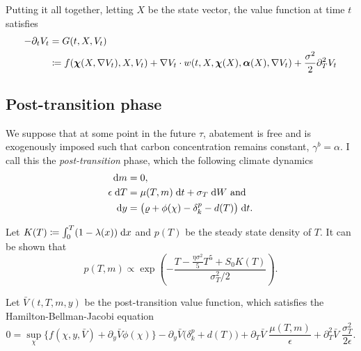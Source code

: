\documentclass[../../main.tex]{subfiles}
\begin{document}
Putting it all together, letting $X$ be the state vector, the value function at time $t$ satisfies \begin{equation}
    \begin{split}
        -\partial_t V_t &= G(t, X, V_t) \\
        &\coloneqq f(\bm{\chi}(X, \nabla V_t), X, V_t) + \nabla V_t \cdot w(t, X, \bm{\chi}(X), \bm{\alpha}(X),  \nabla V_t) + \frac{\sigma^2}{2} \partial_{T}^2 V_t
    \end{split}
\end{equation}


\subsection{Post-transition phase}

We suppose that at some point in the future $\tau$, abatement is free and is exogenously imposed such that carbon concentration remains constant, $\gamma^b = \alpha$. I call this the \textit{post-transition} phase, which the following climate dynamics \begin{align}
    \mathrm{d}m &= 0, \\
    \epsilon \; \mathrm{d}T &= \mu(T, m) \; \mathrm{d}t + \sigma_T \; \mathrm{d}W \text{ and } \\
    \mathrm{d}y &= \big( \varrho + \phi(\chi) - \delta_k^p - d(T) \big) \; \mathrm{d}t.
\end{align}

Let $K(T) \coloneqq \int^T_0 (1 - \lambda(x)) \; \mathrm{d}x$ and $p(T)$ be the steady state density of $T$. It can be shown that \begin{equation}
    p(T, m) \propto \exp\left(-\frac{T - \frac{\eta \sigma^2}{5} T^5 + S_0 K(T)}{\sigma_T^2 / 2}\right).
\end{equation}

\newpage

Let $\bar{V}(t, T, m, y)$ be the post-transition value function, which satisfies the Hamilton-Bellman-Jacobi equation \begin{equation}
    0 = \sup_{\chi} \Big\{f(\chi, y, \bar{V}) +  \partial_y \bar{V} \phi(\chi) \Big\} - \partial_y \bar{V} \Big(\delta^{p}_k + d(T)\Big) + \partial_T \bar{V} \; \frac{\mu(T, m)}{\epsilon}+ \partial^2_T \bar{V} \; \frac{\sigma^2_T}{2\epsilon}.
\end{equation}
\end{document}
